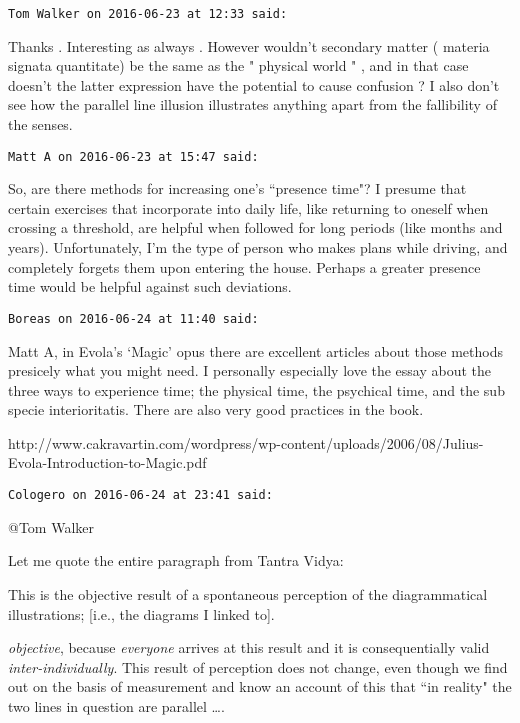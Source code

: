 \begin{footnotesize}\begin{sffamily}



\texttt{Tom Walker on 2016-06-23 at 12:33 said: }

Thanks . Interesting as always . However wouldn't secondary matter ( materia signata quantitate) be the same as the " physical world " , and in that case doesn't the latter expression have the potential to cause confusion ? I also don't see how the parallel line illusion illustrates anything apart from the fallibility of the senses.


\hfill

\texttt{Matt A on 2016-06-23 at 15:47 said: }

So, are there methods for increasing one's ``presence time"? I presume that certain exercises that incorporate into daily life, like returning to oneself when crossing a threshold, are helpful when followed for long periods (like months and years). Unfortunately, I'm the type of person who makes plans while driving, and completely forgets them upon entering the house. Perhaps a greater presence time would be helpful against such deviations.


\hfill

\texttt{Boreas on 2016-06-24 at 11:40 said: }

Matt A, in Evola's `Magic' opus there are excellent articles about those methods presicely what you might need. I personally especially love the essay about the three ways to experience time; the physical time, the psychical time, and the sub specie interioritatis. There are also very good practices in the book.

http://www.cakravartin.com/wordpress/wp-content/uploads/2006/08/Julius-Evola-Introduction-to-Magic.pdf

\texttt{Cologero on 2016-06-24 at 23:41 said: }

@Tom Walker

Let me quote the entire paragraph from Tantra Vidya:

\begin{quotex}
This is the objective result of a spontaneous perception of the diagrammatical illustrations; [i.e., the diagrams I linked to].

\emph{objective}, because \emph{everyone} arrives at this result and it is consequentially valid \emph{inter-individually}. This result of perception does not change, even though we find out on the basis of measurement and know an account of this that ``in reality" the two lines in question are parallel ….


\end{quotex}
\end{sffamily}
\end{footnotesize}
